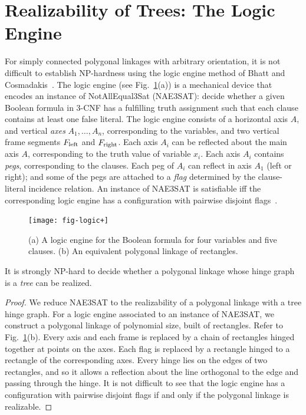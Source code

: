 \documentclass[runningheads]{article}
\begin{document}
\newpage
\appendix

\section{Realizability of Trees: The Logic Engine\label{sec:logic}}

For simply connected polygonal linkages with arbitrary orientation, it is not difficult to establish NP-hardness using the logic engine method of Bhatt and Cosmadakis~\cite{BC87,BET+99}. The logic engine (see Fig.~\ref{fig:logic}(a)) is a mechanical device that encodes an instance of {\sc NotAllEqual3Sat} (NAE3SAT): decide whether a given Boolean formula in 3-CNF has a fulfilling truth assignment such that each clause contains at least one false literal. The logic engine consists of a horizontal axis $A$, and vertical \emph{axes} $A_1,\ldots , A_n$,  corresponding to the variables, and two vertical frame segments $F_{\rm left}$ and $F_{\rm right}$. Each axis $A_i$ can be reflected about the main axis $A$, corresponding to the truth value of variable $x_i$. Each axis $A_i$ contains \emph{pegs}, corresponding to the clauses. Each peg of $A_i$ can reflect in axis $A_1$ (left or right); and some of the pegs are attached to a \emph{flag} determined by the clause-literal incidence relation. An instance of NAE3SAT is satisfiable iff the corresponding logic engine has a configuration with pairwise disjoint flags~\cite{BC87,BET+99}.

\begin{figure}[htbp]
  \centering
 \texttt{[image: fig-logic+]}
\caption{\small (a) A logic engine for the Boolean formula for four variables and five clauses.
(b) An equivalent polygonal linkage of rectangles.}
  \label{fig:logic}
\end{figure}

\begin{theorem}\label{thm:hinge1}
It is strongly NP-hard to decide whether a polygonal linkage whose hinge graph is a \emph{tree} can be realized.
\end{theorem}
\begin{proof}
We reduce NAE3SAT to the realizability of a polygonal linkage with a tree hinge graph. For a logic engine associated to an instance of NAE3SAT, we construct a polygonal linkage of polynomial size, built of rectangles. Refer to Fig.~\ref{fig:logic}(b). Every axis and each frame is replaced by a chain of rectangles hinged together at points on the axes. Each flag is replaced by a rectangle hinged to a rectangle of the corresponding axes. Every hinge lies on the edges of two rectangles, and so it allows a reflection about the line orthogonal to the edge and passing through the hinge. It is not difficult to see that the logic engine has a configuration with pairwise disjoint flags if and only if the polygonal linkage is realizable.
\end{proof}
\end{document}
